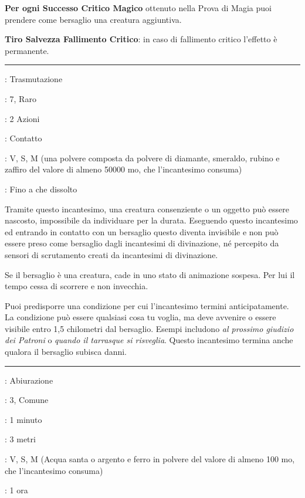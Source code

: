 \begin{multicols}{2}
\textbf{Per ogni Successo Critico Magico} ottenuto nella Prova di Magia puoi prendere come bersaglio una creatura aggiuntiva.

\textbf{Tiro Salvezza Fallimento Critico}: in caso di fallimento critico l'effetto è permanente.

\smallskip\noindent\rule{\linewidth}{2pt} \hypertarget{Celare}{}\medskip{}
\noindent
\begin{description}[noitemsep, topsep=0pt, parsep=0pt, partopsep=0pt, leftmargin=0cm, labelwidth=2.8cm]
	\item[\textbf{Lista di Magia}]: Trasmutazione
	\item[\textbf{Livello}]: 7, Raro
	\item[\textbf{T. di Lancio}]: 2 Azioni
	\item[\textbf{Gittata}]: Contatto
	\item[\textbf{Componenti}]: V, S, M (una polvere composta da polvere di diamante, smeraldo, rubino e zaffiro del valore di almeno 50000 mo, che l'incantesimo consuma)
	\item[\textbf{Durata}]: Fino a che dissolto
\end{description}

Tramite questo incantesimo, una creatura consenziente o un oggetto può essere nascosto, impossibile da individuare per la durata. Eseguendo questo incantesimo ed entrando in contatto con un bersaglio questo diventa invisibile e non può essere preso come bersaglio dagli incantesimi di divinazione, né percepito da sensori di scrutamento creati da incantesimi di divinazione.

Se il bersaglio è una creatura, cade in uno stato di animazione sospesa. Per lui il tempo cessa di scorrere e non invecchia.

Puoi predisporre una condizione per cui l'incantesimo termini anticipatamente. La condizione può essere qualsiasi cosa tu voglia, ma deve avvenire o essere visibile entro 1,5 chilometri dal bersaglio. Esempi includono \emph{al prossimo giudizio dei Patroni} o \emph{quando il tarrasque si risveglia}. Questo incantesimo termina anche qualora il bersaglio subisca danni.

\smallskip\noindent\rule{\linewidth}{2pt} \hypertarget{Cerchio Magico}{}\medskip{}
\noindent
\begin{description}[noitemsep, topsep=0pt, parsep=0pt, partopsep=0pt, leftmargin=0cm, labelwidth=2.8cm]
	\item[\textbf{Lista di Magia}]: Abiurazione
	\item[\textbf{Livello}]: 3, Comune
	\item[\textbf{T. di Lancio}]: 1 minuto
	\item[\textbf{Gittata}]: 3 metri
	\item[\textbf{Componenti}]: V, S, M (Acqua santa o argento e ferro in polvere del valore di almeno 100 mo, che l'incantesimo consuma)
	\item[\textbf{Durata}]: 1 ora
\end{description}


\end{multicols}
